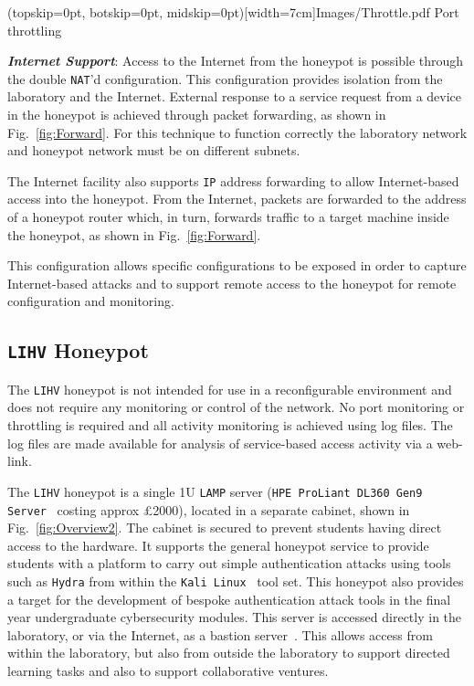 \documentclass{ieeeaccess}
\begin{document}
\Figure[t!](topskip=0pt, botskip=0pt, midskip=0pt)[width=7cm]{Images/Throttle.pdf}
{Port throttling\label{fig:throttling}}


\noindent\textit{\textbf{Internet Support}}:
Access to the Internet from the honeypot is possible through the double
\texttt{NAT}'d configuration. This configuration provides isolation from the
laboratory and the Internet. External response to a service request from a
device in the honeypot is achieved through packet forwarding, as shown in
Fig.~\ref{fig:Forward}. For this technique to function correctly the laboratory
network and honeypot network must be on different subnets.

The Internet facility also supports \texttt{IP} address forwarding to allow
Internet-based access into the honeypot. From the Internet, packets are
forwarded to the address of a honeypot router which, in turn, forwards traffic
to a target machine inside the honeypot, as shown in Fig.~\ref{fig:Forward}.

This configuration allows specific configurations to be exposed in order to
capture Internet-based attacks and to support remote access to the honeypot for
remote configuration and monitoring.

\subsection{\texttt{LIHV} Honeypot}

The \texttt{LIHV} honeypot is not intended for use in a reconfigurable
environment and does not require any monitoring or control of the network. No
port monitoring or throttling is required and all activity monitoring is
achieved using log files. The log files are made available 
for analysis of service-based access activity via a web-link.

The \texttt{LIHV} honeypot is a single 1U \texttt{LAMP} server (\texttt{HPE
ProLiant DL360 Gen9 Server}~\cite{HPE:17} costing approx \pounds2000), located
in a separate cabinet, shown in Fig.~\ref{fig:Overview2}. The cabinet is
secured to prevent students having direct access to the hardware. It supports
the general honeypot service to provide students with a platform to carry out
simple authentication attacks using tools such as \texttt{Hydra} from within
the \texttt{Kali Linux}~\cite{OS:17} tool set. This honeypot also provides a
target for the development of bespoke authentication attack tools in the final
year undergraduate cybersecurity modules.  This server is accessed directly in
the laboratory, or via the Internet, as a bastion server~\cite{MB:05}. This
allows access from within the laboratory, but also from outside the laboratory
to support directed learning tasks and also to support collaborative ventures.
\end{document}
